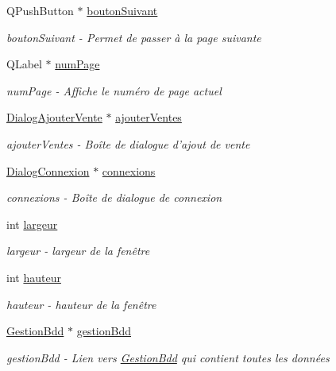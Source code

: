 \begin{DoxyCompactItemize}
Q\-Push\-Button $\ast$ \hyperlink{class_ma_fenetre_a54110f455a71febc15224b68470dd80e}{bouton\-Suivant}
\begin{DoxyCompactList}\small\item\em bouton\-Suivant -\/ Permet de passer à la page suivante \end{DoxyCompactList}\item 
Q\-Label $\ast$ \hyperlink{class_ma_fenetre_a941eff753d1e20d0ef212aa875570330}{num\-Page}
\begin{DoxyCompactList}\small\item\em num\-Page -\/ Affiche le numéro de page actuel \end{DoxyCompactList}\item 
\hyperlink{class_dialog_ajouter_vente}{Dialog\-Ajouter\-Vente} $\ast$ \hyperlink{class_ma_fenetre_a2332279c45b76ac1c9daf739c0bb3958}{ajouter\-Ventes}
\begin{DoxyCompactList}\small\item\em ajouter\-Ventes -\/ Boîte de dialogue d'ajout de vente \end{DoxyCompactList}\item 
\hyperlink{class_dialog_connexion}{Dialog\-Connexion} $\ast$ \hyperlink{class_ma_fenetre_a3c115601ad85a01422813dcdf48eb44d}{connexions}
\begin{DoxyCompactList}\small\item\em connexions -\/ Boîte de dialogue de connexion \end{DoxyCompactList}\item 
int \hyperlink{class_ma_fenetre_abe37db89fd8895cc34ccc0f5cda67aaf}{largeur}
\begin{DoxyCompactList}\small\item\em largeur -\/ largeur de la fenêtre \end{DoxyCompactList}\item 
int \hyperlink{class_ma_fenetre_ae1a802d46705239d08d3bf06cd99b802}{hauteur}
\begin{DoxyCompactList}\small\item\em hauteur -\/ hauteur de la fenêtre \end{DoxyCompactList}\item 
\hyperlink{class_gestion_bdd}{Gestion\-Bdd} $\ast$ \hyperlink{class_ma_fenetre_a34d71a96cedb508c72afb02c70ff9609}{gestion\-Bdd}
\begin{DoxyCompactList}\small\item\em gestion\-Bdd -\/ Lien vers \hyperlink{class_gestion_bdd}{Gestion\-Bdd} qui contient toutes les données \end{DoxyCompactList}\end{DoxyCompactItemize}


